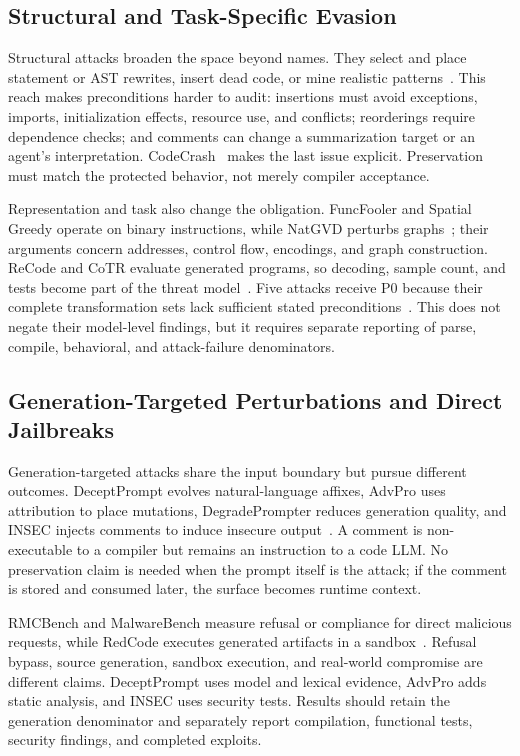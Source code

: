 \documentclass[acmsmall,screen,review]{acmart}
\begin{document}
\subsection{Structural and Task-Specific Evasion}
Structural attacks broaden the space beyond names. They select and place statement or AST rewrites, insert dead code, or mine realistic patterns~\cite{srikant2021generating,ramakrishnan2022semantic,na2023dip,nguyen2023graphcodeattack,tian2023coda,gao2023dak,sloda2025}. This reach makes preconditions harder to audit: insertions must avoid exceptions, imports, initialization effects, resource use, and conflicts; reorderings require dependence checks; and comments can change a summarization target or an agent's interpretation. CodeCrash~\cite{codecrash2025} makes the last issue explicit. Preservation must match the protected behavior, not merely compiler acceptance.

Representation and task also change the obligation. FuncFooler and Spatial Greedy operate on binary instructions, while NatGVD perturbs graphs~\cite{funcfooler2022,spatialgreedy2024,natgvd2025}; their arguments concern addresses, control flow, encodings, and graph construction. ReCode and CoTR evaluate generated programs, so decoding, sample count, and tests become part of the threat model~\cite{wang2023recode,yang2025cotr}. Five attacks receive P0 because their complete transformation sets lack sufficient stated preconditions~\cite{jha2023codeattack,liu2024eatvul,explainability2025,transfer2024coding,treat2025}. This does not negate their model-level findings, but it requires separate reporting of parse, compile, behavioral, and attack-failure denominators.

\subsection{Generation-Targeted Perturbations and Direct Jailbreaks}
Generation-targeted attacks share the input boundary but pursue different outcomes. DeceptPrompt evolves natural-language affixes, AdvPro uses attribution to place mutations, DegradePrompter reduces generation quality, and INSEC injects comments to induce insecure output~\cite{deceptprompt2023,jiang2024advpro,degradeprompter2024,jenko2025insec}. A comment is non-executable to a compiler but remains an instruction to a code LLM. No preservation claim is needed when the prompt itself is the attack; if the comment is stored and consumed later, the surface becomes runtime context.

RMCBench and MalwareBench measure refusal or compliance for direct malicious requests, while RedCode executes generated artifacts in a sandbox~\cite{rmcbench2024,malwarebench2025,redcode2024}. Refusal bypass, source generation, sandbox execution, and real-world compromise are different claims. DeceptPrompt uses model and lexical evidence, AdvPro adds static analysis, and INSEC uses security tests. Results should retain the generation denominator and separately report compilation, functional tests, security findings, and completed exploits.
\end{document}
